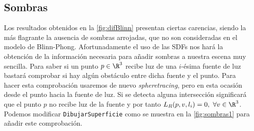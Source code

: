 \subsection{Sombras}\label{sec:sombras}
Los resultados obtenidos en la \autoref{fig:difBlinn} presentan ciertas carencias, siendo la más flagrante la ausencia de sombras arrojadas, que no son consideradas en el modelo de Blinn-Phong. Afortunadamente el uso de las SDFs nos hará la obtención de la información necesaria para añadir sombras a nuestra escena muy sencilla. Para saber si un punto $p\in\R^3$ recibe luz de una $i$-ésima fuente de luz bastará comprobar si hay algún obstáculo entre dicha fuente y el punto. Para hacer esta comprobación usaremos de nuevo \textit{spheretracing}, pero en esta ocasión desde el punto hacia la fuente de luz. Si se detecta alguna intersección significará que el punto $p$ no recibe luz de la fuente y por tanto $L_R(p,v,l_i) = 0,\ \forall v\in \R^3$. Podemos modificar \texttt{DibujarSuperficie} como se muestra en la \autoref{fig:sombras1} para añadir este comprobación.\newline

